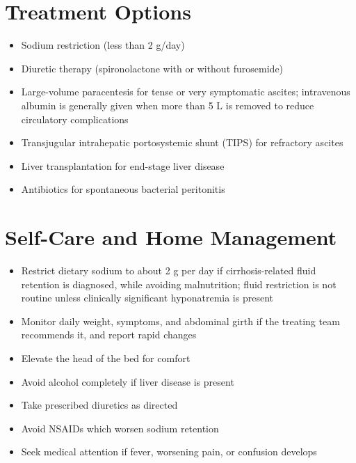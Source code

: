 \section*{Treatment Options}
\begin{itemize}
\item Sodium restriction (less than 2 g/day)
\item Diuretic therapy (spironolactone with or without furosemide)
\item Large-volume paracentesis for tense or very symptomatic ascites; intravenous albumin is generally given when more than 5 L is removed to reduce circulatory complications
\item Transjugular intrahepatic portosystemic shunt (TIPS) for refractory ascites
\item Liver transplantation for end-stage liver disease
\item Antibiotics for spontaneous bacterial peritonitis
\end{itemize}

\section*{Self-Care and Home Management}
\begin{itemize}
\item Restrict dietary sodium to about 2 g per day if cirrhosis-related fluid retention is diagnosed, while avoiding malnutrition; fluid restriction is not routine unless clinically significant hyponatremia is present
\item Monitor daily weight, symptoms, and abdominal girth if the treating team recommends it, and report rapid changes
\item Elevate the head of the bed for comfort
\item Avoid alcohol completely if liver disease is present
\item Take prescribed diuretics as directed
\item Avoid NSAIDs which worsen sodium retention
\item Seek medical attention if fever, worsening pain, or confusion develops
\end{itemize}

